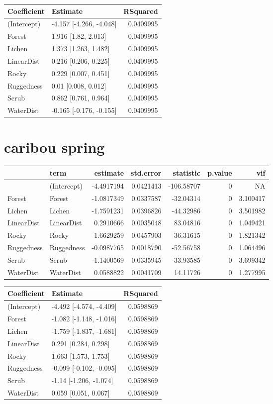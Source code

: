 \documentclass[]{article}
\begin{document}
\begin{tabular}{llr}
\toprule
Coefficient & Estimate & RSquared\\
\midrule
(Intercept) & -4.157 [-4.266, -4.048] & 0.0409995\\
Forest & 1.916 [1.82, 2.013] & 0.0409995\\
Lichen & 1.373 [1.263, 1.482] & 0.0409995\\
LinearDist & 0.216 [0.206, 0.225] & 0.0409995\\
Rocky & 0.229 [0.007, 0.451] & 0.0409995\\
Ruggedness & 0.01 [0.008, 0.012] & 0.0409995\\
Scrub & 0.862 [0.761, 0.964] & 0.0409995\\
WaterDist & -0.165 [-0.176, -0.155] & 0.0409995\\
\bottomrule
\end{tabular}

\section{caribou spring}\label{caribou-spring}

\begin{tabular}{llrrrrr}
\toprule
  & term & estimate & std.error & statistic & p.value & vif\\
\midrule
 & (Intercept) & -4.4917194 & 0.0421413 & -106.58707 & 0 & NA\\
Forest & Forest & -1.0817349 & 0.0337587 & -32.04314 & 0 & 3.100417\\
Lichen & Lichen & -1.7591231 & 0.0396826 & -44.32986 & 0 & 3.501982\\
LinearDist & LinearDist & 0.2910666 & 0.0035048 & 83.04816 & 0 & 1.049421\\
Rocky & Rocky & 1.6629259 & 0.0457903 & 36.31615 & 0 & 1.821342\\
Ruggedness & Ruggedness & -0.0987765 & 0.0018790 & -52.56758 & 0 & 1.064496\\
Scrub & Scrub & -1.1400569 & 0.0335945 & -33.93585 & 0 & 3.699342\\
WaterDist & WaterDist & 0.0588822 & 0.0041709 & 14.11726 & 0 & 1.277995\\
\bottomrule
\end{tabular}

\begin{tabular}{llr}
\toprule
Coefficient & Estimate & RSquared\\
\midrule
(Intercept) & -4.492 [-4.574, -4.409] & 0.0598869\\
Forest & -1.082 [-1.148, -1.016] & 0.0598869\\
Lichen & -1.759 [-1.837, -1.681] & 0.0598869\\
LinearDist & 0.291 [0.284, 0.298] & 0.0598869\\
Rocky & 1.663 [1.573, 1.753] & 0.0598869\\
Ruggedness & -0.099 [-0.102, -0.095] & 0.0598869\\
Scrub & -1.14 [-1.206, -1.074] & 0.0598869\\
WaterDist & 0.059 [0.051, 0.067] & 0.0598869\\
\bottomrule
\end{tabular}
\end{document}
